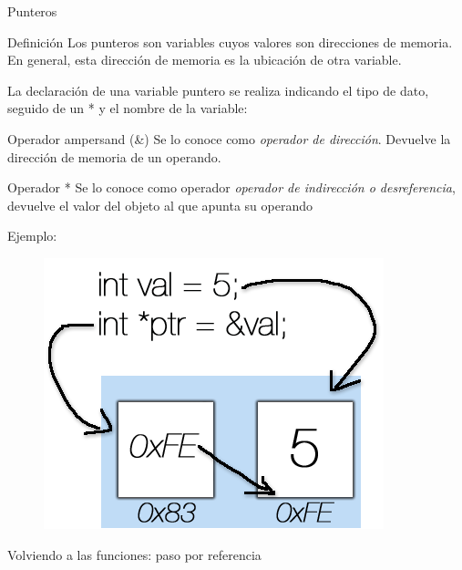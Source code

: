 \documentclass[xcolor=pdftex,table,11pt]{beamer}
\begin{document}
\begin{frame}[allowframebreaks]{Punteros}
\begin{block}{Definición}
Los punteros son variables cuyos valores son direcciones de memoria. En general, esta dirección de memoria es la ubicación de otra variable.
\end{block}

La declaración de una variable puntero se realiza indicando el tipo de dato, seguido de un * y el nombre de la variable:


\codesetstylefrombeamer
{}



\begin{block}{Operador ampersand (\&)}
Se lo conoce como \textit{operador de dirección}. Devuelve la dirección de memoria de un operando.
\end{block}

\begin{block}{Operador *}
Se lo conoce como operador \textit{operador de indirección o desreferencia}, devuelve el valor del objeto al que apunta su operando
\end{block}

Ejemplo:

\codesetstylefrombeamer
{}


 \begin{figure}
 \centering
\includegraphics[scale=0.7]{../img/exported/pointers.png}
\end{figure}
\end{frame}

\begin{frame}[allowframebreaks]{Volviendo a las funciones: paso por referencia}
\codesetstylefrombeamer
{}
\end{frame}
\end{document}
